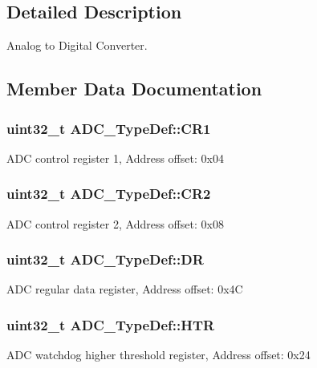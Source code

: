 \subsection{Detailed Description}
Analog to Digital Converter. 

\subsection{Member Data Documentation}
\subsubsection[{\texorpdfstring{C\+R1}{CR1}}]{ uint32\+\_\+t A\+D\+C\+\_\+\+Type\+Def\+::\+C\+R1}\hypertarget{struct_a_d_c___type_def_a89b1ff4376683dd2896ea8b32ded05b2}{}\label{struct_a_d_c___type_def_a89b1ff4376683dd2896ea8b32ded05b2}
A\+DC control register 1, Address offset\+: 0x04 
\subsubsection[{\texorpdfstring{C\+R2}{CR2}}]{ uint32\+\_\+t A\+D\+C\+\_\+\+Type\+Def\+::\+C\+R2}\hypertarget{struct_a_d_c___type_def_a1053a65a21af0d27afe1bf9cf7b7aca7}{}\label{struct_a_d_c___type_def_a1053a65a21af0d27afe1bf9cf7b7aca7}
A\+DC control register 2, Address offset\+: 0x08 
\subsubsection[{\texorpdfstring{DR}{DR}}]{ uint32\+\_\+t A\+D\+C\+\_\+\+Type\+Def\+::\+DR}\hypertarget{struct_a_d_c___type_def_a84114accead82bd11a0e12a429cdfed9}{}\label{struct_a_d_c___type_def_a84114accead82bd11a0e12a429cdfed9}
A\+DC regular data register, Address offset\+: 0x4C 
\subsubsection[{\texorpdfstring{H\+TR}{HTR}}]{ uint32\+\_\+t A\+D\+C\+\_\+\+Type\+Def\+::\+H\+TR}\hypertarget{struct_a_d_c___type_def_a297ac2d83a1837bfdc0333474b977de0}{}\label{struct_a_d_c___type_def_a297ac2d83a1837bfdc0333474b977de0}
A\+DC watchdog higher threshold register, Address offset\+: 0x24 
